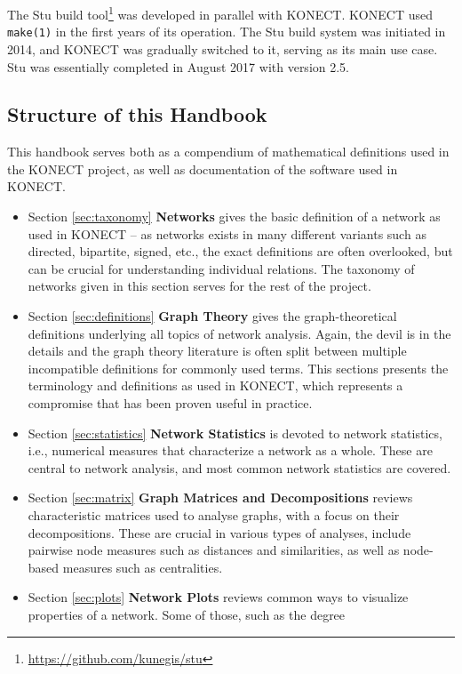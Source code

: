 \documentclass{article}
\begin{document}
The Stu build
tool\footnote{\href{https://github.com/kunegis/stu}{https://github.com/kunegis/stu}}
was developed in parallel with KONECT.  KONECT used \texttt{make(1)} in
the first years of its operation.  The Stu build system was initiated in
2014, and KONECT was gradually switched to it, serving as its main use
case.  Stu was essentially completed in August 2017 with version 2.5. 

\subsection{Structure of this Handbook}
This handbook serves both as a compendium of mathematical definitions
used in the KONECT project, as well as documentation of the software
used in KONECT. 
\begin{itemize}
\item Section \ref{sec:taxonomy} \textbf{Networks} gives the basic
  definition of a network as used in KONECT -- as networks exists in
  many different variants such as directed, bipartite, signed, etc., the
  exact definitions are often overlooked, but can be crucial for
  understanding individual relations. The taxonomy of networks given in
  this section serves for the rest of the project. 
\item Section \ref{sec:definitions} \textbf{Graph Theory} gives the
  graph-theoretical definitions underlying all topics of network analysis.  Again,
  the devil is in the details and the graph theory literature is often
  split between multiple incompatible definitions for commonly used
  terms.  This sections presents the terminology and definitions as used
  in KONECT, which represents a compromise that has been proven useful
  in practice. 
\item Section \ref{sec:statistics} \textbf{Network Statistics} is devoted to
  network statistics, i.e., numerical measures that characterize a
  network as a whole.  These are central to network analysis, and most
  common network statistics are covered. 
\item Section \ref{sec:matrix} \textbf{Graph Matrices and Decompositions} reviews
  characteristic matrices used to analyse graphs, with a focus on their
  decompositions.  These are crucial in various types of analyses,
  include pairwise node measures such as distances and similarities, as
  well as node-based measures such as centralities. 
\item Section \ref{sec:plots} \textbf{Network Plots} reviews common ways to
  visualize properties of a network.  Some of those, such as the degree

\end{itemize}
\end{document}
